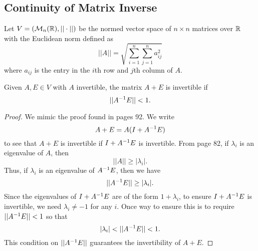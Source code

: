 \documentclass[letterpaper,titlepage]{article}
\begin{document}
\subsection{Continuity of Matrix Inverse}
Let $V=(\mathcal{M}_n(\mathbb{R}), ||\cdot||)$ be the normed vector space of $n\times n$ matrices over $\mathbb{R}$ with the Euclidean norm defined as
$$||A|| = \sqrt{\sum_{i=1}^n\sum_{j=1}^na_{ij}^2}$$
where $a_{ij}$ is the entry in the $i$th row and $j$th column of $A$.
\begin{lem}\label{AplusE_invertible}
    Given $A,E \in V$ with $A$ invertible, the matrix $A+E$ is invertible if
    $$||A^{-1} E|| < 1.$$
\end{lem}
\begin{proof}
    We mimic the proof found in \cite{Wilkinson} pages 92. We write
    \begin{equation}\label{rewrite_AplusE}
        A+E = A(I+A^{-1} E)
    \end{equation}
    to see that $A+E$ is invertible if $I+A^{-1} E$ is invertible. From \cite{Wilkinson} page 82, if $\lambda_i$ is an eigenvalue of $A$, then
    $$||A||\geq|\lambda_i|.$$
    Thus, if $\lambda_i$ is an eigenvalue of $A^{-1} E$, then we have
    $$||A^{-1} E|| \geq |\lambda_i|.$$
    Since the eigenvalues of $I+A^{-1} E$ are of the form $1+\lambda_i$, to ensure $I+A^{-1} E$ is invertible, we need $\lambda_i \neq -1$ for any $i$. Once way to ensure this is to require $||A^{-1} E||<1$ so that
    $$|\lambda_i|<||A\inv E||< 1.$$
    This condition on $||A^{-1} E||$ guarantees the invertibility of $A+E$.
\end{proof}
\end{document}
